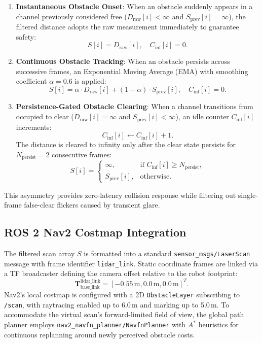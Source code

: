 \documentclass[preprint,12pt]{elsarticle}
\begin{document}
\begin{enumerate}
  \item \textbf{Instantaneous Obstacle Onset}: When an obstacle suddenly appears in a channel previously considered free ($D_{\mathrm{raw}}[i] < \infty$ and $S_{\mathrm{prev}}[i] = \infty$), the filtered distance adopts the raw measurement immediately to guarantee safety:
  \begin{equation}
    S[i] = D_{\mathrm{raw}}[i], \quad C_{\mathrm{inf}}[i] = 0.
  \end{equation}
  \item \textbf{Continuous Obstacle Tracking}: When an obstacle persists across successive frames, an Exponential Moving Average (EMA) with smoothing coefficient $\alpha = 0.6$ is applied:
  \begin{equation}
    S[i] = \alpha \cdot D_{\mathrm{raw}}[i] + (1 - \alpha) \cdot S_{\mathrm{prev}}[i], \quad C_{\mathrm{inf}}[i] = 0.
  \end{equation}
  \item \textbf{Persistence-Gated Obstacle Clearing}: When a channel transitions from occupied to clear ($D_{\mathrm{raw}}[i] = \infty$ and $S_{\mathrm{prev}}[i] < \infty$), an idle counter $C_{\mathrm{inf}}[i]$ increments:
  \begin{equation}
    C_{\mathrm{inf}}[i] \gets C_{\mathrm{inf}}[i] + 1.
  \end{equation}
  The distance is cleared to infinity only after the clear state persists for $N_{\mathrm{persist}} = 2$ consecutive frames:
  \begin{equation}
    S[i] = \begin{cases} \infty, & \text{if } C_{\mathrm{inf}}[i] \ge N_{\mathrm{persist}}, \\ S_{\mathrm{prev}}[i], & \text{otherwise.} \end{cases}
  \end{equation}
\end{enumerate}
This asymmetry provides zero-latency collision response while filtering out single-frame false-clear flickers caused by transient glare.

\subsection{ROS 2 Nav2 Costmap Integration}
The filtered scan array $S$ is formatted into a standard \texttt{sensor\_msgs/LaserScan} message with frame identifier \texttt{lidar\_link}. Static coordinate frames are linked via a TF broadcaster defining the camera offset relative to the robot footprint:
\begin{equation}
  \mathbf{T}_{\mathrm{base\_link}}^{\mathrm{lidar\_link}} = [-0.55\,\text{m}, 0.0\,\text{m}, 0.0\,\text{m}]^T.
\end{equation}
Nav2's local costmap is configured with a 2D \texttt{ObstacleLayer} subscribing to \texttt{/scan}, with raytracing enabled up to 6.0\,m and marking up to 5.0\,m. To accommodate the virtual scan's forward-limited field of view, the global path planner employs \texttt{nav2\_navfn\_planner/NavfnPlanner} with $A^*$ heuristics for continuous replanning around newly perceived obstacle costs.
\end{document}
